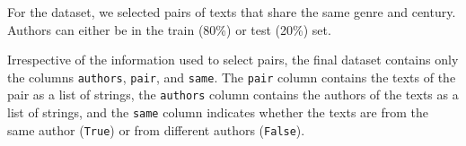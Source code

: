 For the \dataGutenberg{} dataset,
we selected pairs of texts that share the same genre and century.
Authors can either be in the train (80\%) or test (20\%) set.

Irrespective of the information used to select pairs, the final dataset contains only the columns \texttt{authors}, \texttt{pair}, and \texttt{same}.
The \texttt{pair} column contains the texts of the pair as a list of strings,
the \texttt{authors} column contains the authors of the texts as a list of strings,
and the \texttt{same} column indicates whether the texts are from the same author (\texttt{True}) or from different authors (\texttt{False}).
